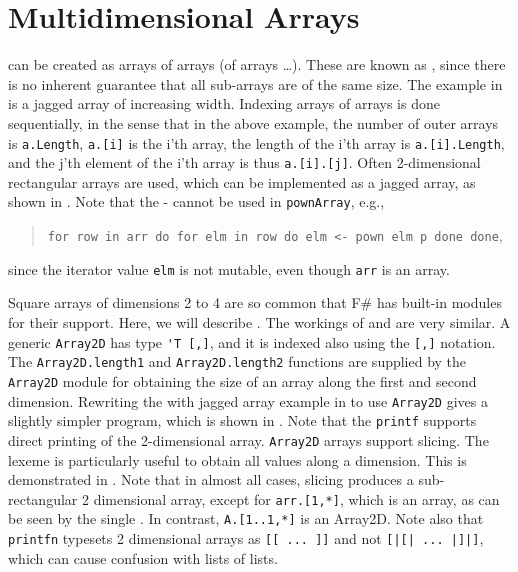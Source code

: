 \section{Multidimensional Arrays}
 can be created as arrays of arrays (of arrays \dots). These are known as , since there is no inherent guarantee that all sub-arrays are of the same size. The example in  is a jagged array of increasing width.
%
%
Indexing arrays of arrays is done sequentially, in the sense that in the above example, the number of outer arrays is \lstinline|a.Length|,  \lstinline|a.[i]| is the i'th array, the length of the i'th array is \lstinline|a.[i].Length|, and the j'th element of the i'th array is thus \lstinline|a.[i].[j]|. Often 2-dimensional rectangular arrays are used, which can be implemented as a jagged array, as shown in .
%
%
Note that the - cannot be used in \lstinline!pownArray!, e.g., 
\begin{quote} 
  \mbox{\lstinline{for row in arr do for elm in row do elm <- pown elm p done done}},
 \end{quote}
since the iterator value \lstinline!elm! is not mutable, even though \lstinline!arr! is an array.

Square arrays of dimensions 2 to 4 are so common that F\# has built-in modules for their support. Here, we will describe . The workings of  and  are very similar. A generic \lstinline{Array2D} has type \lstinline{'T [,]}, and it is indexed also using the \lstinline|[,]| notation. The \lstinline{Array2D.length1} and \lstinline{Array2D.length2} functions are supplied by the \lstinline{Array2D} module for obtaining the size of an array along the first and second dimension. Rewriting the with jagged array example in  to use \lstinline{Array2D} gives a slightly simpler program, which is shown in .
%
%
Note that the \lstinline!printf! supports direct printing of the 2-dimensional array. \lstinline{Array2D} arrays support slicing. The \lexeme{*} lexeme is particularly useful to obtain all values along a dimension. This is demonstrated in .
%
%
Note that in almost all cases, slicing produces a sub-rectangular 2 dimensional array, except for \lstinline{arr.[1,*]}, which is an array, as can be seen by the single \lexeme{[}. In contrast, \lstinline{A.[1..1,*]} is an Array2D. Note also that \lstinline!printfn! typesets 2 dimensional arrays as \lstinline{[[ ... ]]} and not \lstinline{[|[| ... |]|]}, which can cause confusion with lists of lists.

